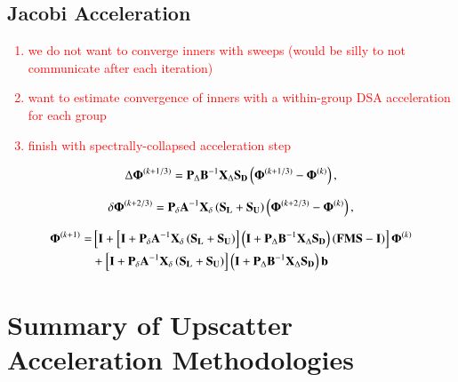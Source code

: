 \documentclass[preprint,10pt]{elsarticle}
\newcommand{\tcr}[1]{\textcolor{red}{#1}}
\begin{document}
\subsection{Jacobi Acceleration}
\tcr
{
\begin{enumerate}
\item we do not want to converge inners with sweeps (would be silly to not communicate after each iteration)
\item want to estimate convergence of inners with a within-group DSA acceleration for each group
\item finish with spectrally-collapsed acceleration step
\end{enumerate}
}

\begin{equation}
\label{eq::DSA_TG_Jac_WIG_phiterm}
 \Delta {\bf \Phi}^{(k+1/3)} = {\bf P}_{\Delta} {\bf B}^{-1} {\bf X}_{\Delta} {\bf S_D} \left(  {\bf \Phi}^{(k+1/3)} - {\bf \Phi}^{(k)} \right),
\end{equation}

\begin{equation}
\label{eq::DSA_TG_Jac_1G_solterm}
  \delta {\bf \Phi}^{(k+2/3)}  ={\bf P}_{\delta}{\bf A}^{-1}  {\bf X}_{\delta}\left(   {\bf S_L} +  {\bf S_U} \right) \left(  {\bf \Phi}^{(k+2/3)} - {\bf \Phi}^{(k)}  \right),
\end{equation}

\begin{equation}
\label{eq::DSA_TG_Jac_update_FULL}
\begin{aligned}
{\bf \Phi}^{(k+1)} =& \left[ {\bf I} +\left[ {\bf I}+ {\bf P}_{\delta}{\bf A}^{-1}  {\bf X}_{\delta}\left(   {\bf S_L} +  {\bf S_U} \right) \right]    \left(  {\bf I} + {\bf P}_{\Delta} {\bf B}^{-1} {\bf X}_{\Delta} {\bf S_D} \right) \left(   {\bf F}  {\bf M} {\bf S}  - {\bf I} \right)   \right]{\bf \Phi}^{(k)} \\
&+  \left[ {\bf I}+ {\bf P}_{\delta}{\bf A}^{-1}  {\bf X}_{\delta}\left(   {\bf S_L} +  {\bf S_U} \right) \right]  \left(  {\bf I} + {\bf P}_{\Delta} {\bf B}^{-1} {\bf X}_{\Delta} {\bf S_D} \right) {\bf b} \\
\end{aligned}
\end{equation}


\section{Summary of Upscatter Acceleration Methodologies} \label{sec::summary}
\end{document}

